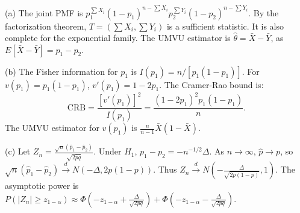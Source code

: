 \begin{solution}
(a) The joint PMF is $p_1^{\sum X_i} (1-p_1)^{n-\sum X_i} p_2^{\sum Y_i} (1-p_2)^{n-\sum Y_i}$. By the factorization theorem, $T = (\sum X_i, \sum Y_i)$ is a sufficient statistic. It is also complete for the exponential family. The UMVU estimator is $\hat{\theta} = \bar{X} - \bar{Y}$, as $E[\bar{X} - \bar{Y}] = p_1 - p_2$.

(b) The Fisher information for $p_1$ is $I(p_1) = n / [p_1(1-p_1)]$. For $v(p_1) = p_1(1-p_1)$, $v'(p_1) = 1-2p_1$. The Cramer-Rao bound is:
\[
\text{CRB} = \frac{[v'(p_1)]^2}{I(p_1)} = \frac{(1-2p_1)^2 p_1(1-p_1)}{n}.
\]
The UMVU estimator for $v(p_1)$ is $\frac{n}{n-1} \bar{X}(1-\bar{X})$.

(c) Let $Z_n = \frac{\sqrt{n}(\hat{p}_1 - \hat{p}_2)}{\sqrt{2\hat{p}\hat{q}}}$. Under $H_1$, $p_1 - p_2 = -n^{-1/2} \Delta$. As $n \to \infty$, $\hat{p} \to p$, so $\sqrt{n}(\hat{p}_1 - \hat{p}_2) \xrightarrow{d} N(-\Delta, 2p(1-p))$. Thus $Z_n \xrightarrow{d} N(-\frac{\Delta}{\sqrt{2p(1-p)}}, 1)$.
The asymptotic power is $P(|Z_n| \ge z_{1-\alpha}) \approx \Phi(-z_{1-\alpha} + \frac{\Delta}{\sqrt{2pq}}) + \Phi(-z_{1-\alpha} - \frac{\Delta}{\sqrt{2pq}})$.
\end{solution}

